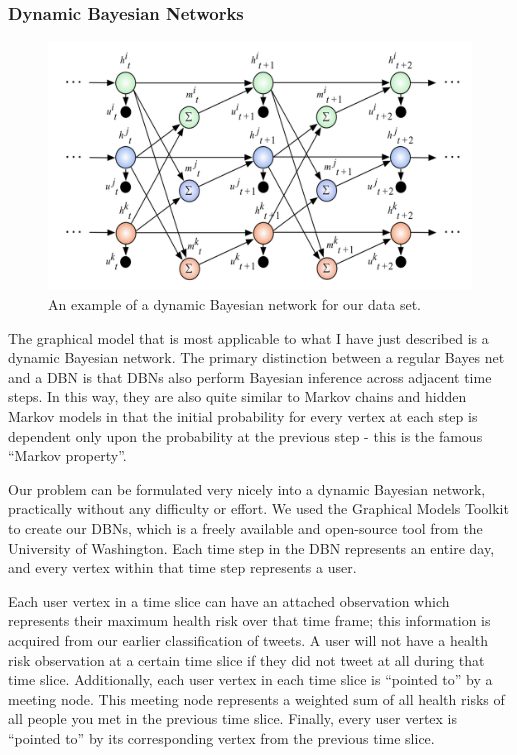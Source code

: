 \documentclass[11pt, letterpaper]{article}
\begin{document}
            \subsubsection{Dynamic Bayesian Networks}
                \begin{figure}[t!]
                    \begin{center}
                        \includegraphics[width=1.0\textwidth]{dbn_example.png}
                        \caption{An example of a dynamic Bayesian network for our data set.}
                        \label{dbn-example}
                    \end{center}
                \end{figure}

                The graphical model that is most applicable to what I have just described is a dynamic Bayesian network. The primary distinction between a regular Bayes net and a DBN is that DBNs also perform Bayesian inference across adjacent time steps. In this way, they are also quite similar to Markov chains and hidden Markov models in that the initial probability for every vertex at each step is dependent only upon the probability at the previous step - this is the famous ``Markov property''.

                Our problem can be formulated very nicely into a dynamic Bayesian network, practically without any difficulty or effort. We used the Graphical Models Toolkit to create our DBNs, which is a freely available and open-source tool from the University of Washington. Each time step in the DBN represents an entire day, and every vertex within that time step represents a user.

                Each user vertex in a time slice can have an attached observation which represents their maximum health risk over that time frame; this information is acquired from our earlier classification of tweets. A user will not have a health risk observation at a certain time slice if they did not tweet at all during that time slice. Additionally, each user vertex in each time slice is ``pointed to'' by a meeting node. This meeting node represents a weighted sum of all health risks of all people you met in the previous time slice. Finally, every user vertex is ``pointed to'' by its corresponding vertex from the previous time slice.
\end{document}
